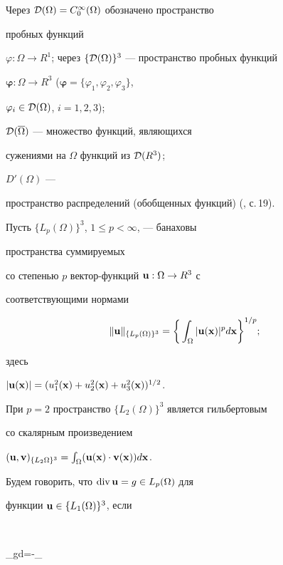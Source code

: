 Через ${\cal D}(\Omega)=C_0^{\infty}(\Omega)$ обозначено пространство


пробных функций


${\varphi:\Omega\rightarrow R^1}$; через $\{{\cal


D}(\Omega)\}^3$ --- пространство пробных функций


$\boldsymbol\varphi:\Omega\rightarrow R^3$ (${\boldsymbol{\varphi}=\{


\varphi_1,\varphi_2,\varphi_3\}}$,


$\varphi_i\in{\cal D}(\Omega)$, $i=1,2,3$);


${\cal D}(\overline{\Omega})$ --- множество функций, являющихся


сужениями на $\Omega$ функций из ${\cal D}(R^3)$;


$D'(\Omega)$ ---


пространство распределений (обобщенных функций) (\cite{3}, с.\,19).





Пусть $\{L_p(\Omega)\}^3$, $1\leq p<\infty$, --- банаховы


пространства суммируемых


со степенью $p$ вектор-функций $\bold u:\Omega\rightarrow R^3$ с


соответствующими нормами


$$


\|\bold{u}\|_{\{L_p(\Omega)\}^3}=\bigg\{\int_{\Omega}|\bold{u}


(\bold{x})|^pd\bold{x}\bigg\}^{1/p};


$$


здесь


$|\bold{u}(\bold{x})|=(u_1^2(\bold{x})+u_2^2(\bold{x})+u_3^2(\bold{x}))^{1/2}$.


При $p=2$ пространство $\{L_2(\Omega)\}^3$ является гильбертовым


со скалярным произведением


$(\bold{u},\bold{v})_{\{L_2{\Omega}\}^3}=\int_{\Omega}(\bold{u}


(\bold{x})\cdot\bold{v}(\bold{x}))d\bold{x}$.





Будем говорить, что $\operatorname{div}\bold{u}=g\in L_p(\Omega)$ для 


функции $\bold{u}\in\{L_1(\Omega)\}^3$, если


$$


\int_{\Omega}g\varphi d=-\int_{\Omega}


